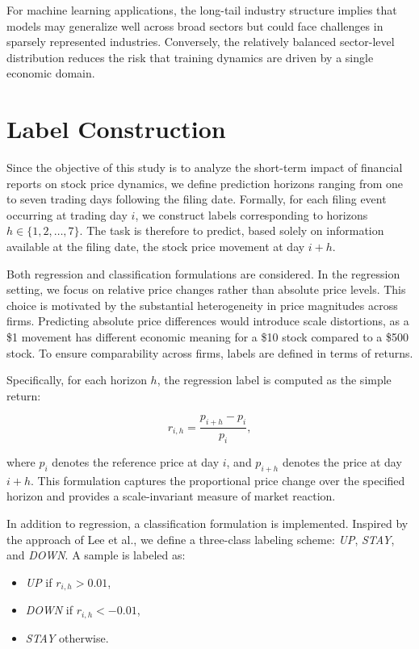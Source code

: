 For machine learning applications, the long-tail industry structure implies that models may generalize well across broad sectors but could face challenges in sparsely represented industries. Conversely, the relatively balanced sector-level distribution reduces the risk that training dynamics are driven by a single economic domain.

\section{Label Construction}

Since the objective of this study is to analyze the short-term impact of financial reports on stock price dynamics, we define prediction horizons ranging from one to seven trading days following the filing date. Formally, for each filing event occurring at trading day $i$, we construct labels corresponding to horizons $h \in \{1,2,\dots,7\}$. The task is therefore to predict, based solely on information available at the filing date, the stock price movement at day $i+h$.

Both regression and classification formulations are considered. In the regression setting, we focus on relative price changes rather than absolute price levels. This choice is motivated by the substantial heterogeneity in price magnitudes across firms. Predicting absolute price differences would introduce scale distortions, as a \$1 movement has different economic meaning for a \$10 stock compared to a \$500 stock. To ensure comparability across firms, labels are defined in terms of returns.

Specifically, for each horizon $h$, the regression label is computed as the simple return:

\begin{equation}
r_{i,h} = \frac{p_{i+h} - p_i}{p_i},
\end{equation}

where $p_i$ denotes the reference price at day $i$, and $p_{i+h}$ denotes the price at day $i+h$. This formulation captures the proportional price change over the specified horizon and provides a scale-invariant measure of market reaction.

In addition to regression, a classification formulation is implemented. Inspired by the approach of Lee et al.\cite{lee-etal-2014-importance}, we define a three-class labeling scheme: \textit{UP}, \textit{STAY}, and \textit{DOWN}. A sample is labeled as:

\begin{itemize}
    \item \textit{UP} if $r_{i,h} > 0.01$,
    \item \textit{DOWN} if $r_{i,h} < -0.01$,
    \item \textit{STAY} otherwise.
\end{itemize}

